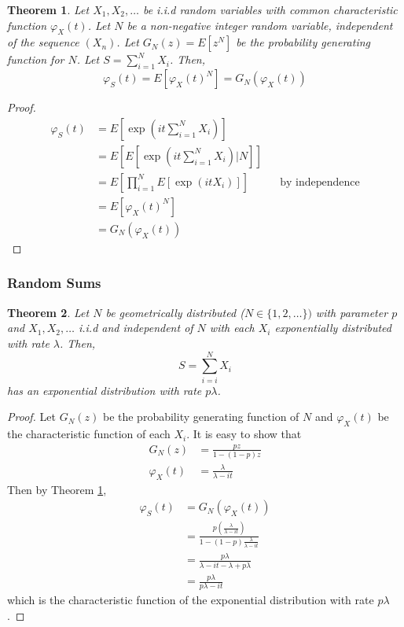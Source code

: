 \documentclass{article}
\theoremstyle{plain}
\newtheorem{theorem}{Theorem}[section]
\theoremstyle{definition}
\theoremstyle{remark}
\numberwithin{equation}{section}
\begin{document}
\begin{theorem}\label{thm:char_func_random_sum}
Let $X_1, X_2, \ldots$ be i.i.d random variables with common characteristic function $\varphi_X(t)$.
Let $N$ be a non-negative integer random variable, independent of the sequence $(X_n)$.
Let $G_N(z) = E[z^N]$ be the probability generating function for $N$.
Let $S = \sum_{i = 1}^N X_i$.
Then,
$$
\varphi_S(t) = E[\varphi_X(t)^N] = G_N(\varphi_X(t))
$$
\end{theorem}

\begin{proof}
\begin{align*}
    \varphi_S(t) &= E[ \exp(it \sum_{i = 1}^N X_i) ]\\
    &= E[ E[ \exp(it \sum_{i = 1}^N X_i) | N ]]\\
    &= E \left[ \prod_{i = 1}^N E[\exp(it X_i)] \right] && \text{by independence}\\
    &= E[\varphi_X(t)^N]\\
    &= G_N(\varphi_X(t))
\end{align*}
\end{proof}

\subsubsection{Random Sums}

\begin{theorem} \label{thm:geom_sum_exp}
Let $N$ be geometrically distributed ($N \in \{1,2,\ldots\})$ with parameter $p$ and $X_1,X_2,\ldots$ i.i.d and independent of $N$ with each $X_i$ exponentially distributed with rate $\lambda$.
Then,
$$
S = \sum_{i = i}^N X_i
$$
has an exponential distribution with rate $p \lambda$.
\end{theorem}

\begin{proof}
Let $G_N(z)$ be the probability generating function of $N$ and $\varphi_X(t)$ be the characteristic function of each $X_i$.
It is easy to show that
\begin{align*}
    G_N(z) &= \frac{pz}{1 - (1 - p)z}\\
    \varphi_X(t) &= \frac{\lambda}{\lambda - it}
\end{align*}
Then by Theorem \ref{thm:char_func_random_sum},
\begin{align*}
    \varphi_S(t) &= G_N(\varphi_X(t))\\
    &= \frac{
        p \left( \frac{\lambda}{\lambda - it} \right)
        } {
        1 - (1 - p) \frac{\lambda}{\lambda - it}
        }\\
    &= \frac{ 
        p \lambda
    } {
        \lambda - it - \lambda + p \lambda
    }\\
    &= \frac{ 
        p \lambda
    } {
        p \lambda - it 
    }
\end{align*}
which is the characteristic function of the exponential distribution with rate $p \lambda$.
\end{proof}
\end{document}
